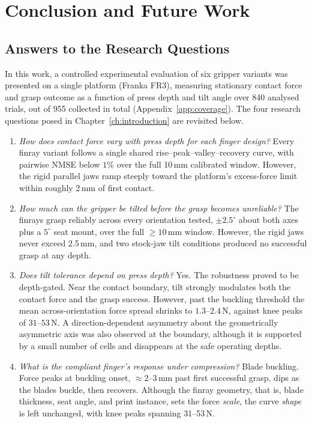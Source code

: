 \chapter{\rm\bfseries Conclusion and Future Work}
\label{ch:conclusion}

\section{Answers to the Research Questions}

In this work, a controlled experimental evaluation of six gripper variants
was presented on a single platform (Franka FR3), measuring stationary
contact force and grasp outcome as a function of press depth and tilt angle
over 840 analysed trials, out of 955 collected in total
(Appendix~\ref{app:coverage}). The four research questions posed in
Chapter~\ref{ch:introduction} are revisited below.

\begin{enumerate}
  \item \emph{How does contact force vary with press depth for each finger
        design?} Every finray variant follows a single shared
        rise--peak--valley--recovery curve, with pairwise NMSE below $1\%$
        over the full 10\,mm calibrated window. However, the rigid
        parallel jaws ramp steeply toward the platform's excess-force
        limit within roughly 2\,mm of first contact.
  \item \emph{How much can the gripper be tilted before the grasp becomes
        unreliable?} The finrays grasp reliably across every orientation
        tested, $\pm 2.5^{\circ}$ about both axes plus a $5^{\circ}$
        seat mount, over the full $\geq 10$\,mm window. However, the
        rigid jaws never exceed 2.5\,mm, and two stock-jaw tilt
        conditions produced no successful grasp at any depth.
  \item \emph{Does tilt tolerance depend on press depth?} Yes. The
        robustness proved to be depth-gated. Near the contact boundary,
        tilt strongly modulates both the contact force and the grasp
        success. However, past the buckling threshold the mean
        across-orientation force spread shrinks to $1.3$--$2.4$\,N,
        against knee peaks of $31$--$53$\,N. A direction-dependent
        asymmetry about the geometrically asymmetric axis was also
        observed at the boundary, although it is supported by a small
        number of cells and disappears at the safe operating depths.
  \item \emph{What is the compliant finger's response under compression?}
        Blade buckling. Force peaks at buckling onset,
        $\approx 2$--$3$\,mm past first successful grasp, dips as the
        blades buckle, then recovers. Although the finray geometry, that
        is, blade thickness, seat angle, and print instance, sets the
        force \emph{scale}, the curve \emph{shape} is left unchanged,
        with knee peaks spanning 31--53\,N.
\end{enumerate}

